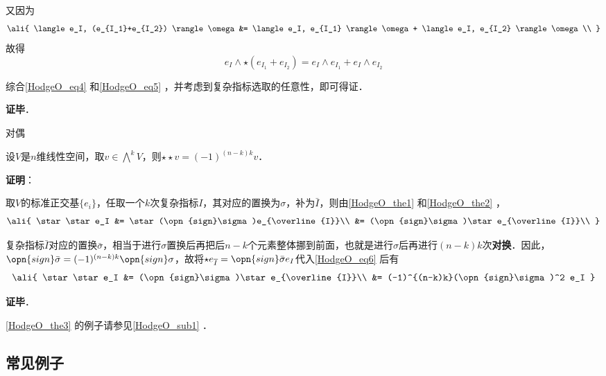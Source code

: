 又因为
\begin{equation}
\ali{
    \langle e_I, (e_{I_1}+e_{I_2}) \rangle \omega &= \langle e_I, e_{I_1} \rangle\omega + \langle e_I, e_{I_2} \rangle\omega\\
}
\end{equation}
故得
\begin{equation}\label{HodgeO_eq5}
e_I\wedge \star(e_{I_1}+e_{I_2}) = e_I\wedge e_{I_1} + e_I\wedge e_{I_2}
\end{equation}

综合\autoref{HodgeO_eq4} 和\autoref{HodgeO_eq5} ，并考虑到复杂指标选取的任意性，即可得证．


\textbf{证毕}．



\begin{theorem}{对偶}\label{HodgeO_the3}

设$V$是$n$维线性空间，取$v\in\bigwedge^k V$，则$\star \star v = (-1)^{(n-k)k} v$．

\end{theorem}

\textbf{证明}：

取$V$的标准正交基$\{e_i\}$，任取一个$k$次复杂指标$I$，其对应的置换为$\sigma$，补为$\bar{I}$，则由\autoref{HodgeO_the1} 和\autoref{HodgeO_the2} ，
\begin{equation}\label{HodgeO_eq6}
\ali{
    \star \star e_I &= \star(\opn{sign}\sigma)e_{\overline{I}}\\
    &= (\opn{sign}\sigma)\star e_{\overline{I}}\\
}
\end{equation}

复杂指标$\bar{I}$对应的置换$\bar{\sigma}$，相当于进行$\sigma$置换后再把后$n-k$个元素整体挪到前面，也就是进行$\sigma$后再进行$(n-k)k$次\textbf{对换}．因此，$\opn{sign}\bar{\sigma}=(-1)^{(n-k)k}\opn{sign}\sigma$，故将$\star e_{\overline{I}}=\opn{sign}\bar{\sigma}e_I$代入\autoref{HodgeO_eq6} 后有
\begin{equation}
\ali{
    \star \star e_I &= (\opn{sign}\sigma)\star e_{\overline{I}}\\
    &= (-1)^{(n-k)k}(\opn{sign}\sigma)^2 e_I
}
\end{equation}

\textbf{证毕}．

\autoref{HodgeO_the3} 的例子请参见\autoref{HodgeO_sub1} ．



\subsection{常见例子}\label{HodgeO_sub1}


